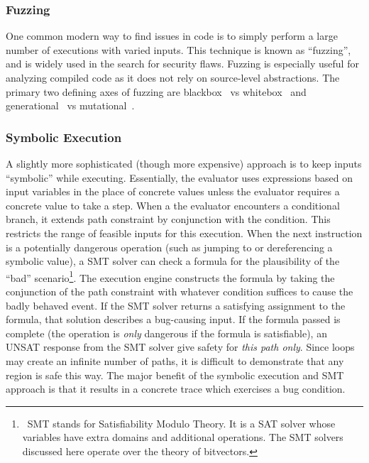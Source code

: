 \subsubsection{Fuzzing}
One common modern way to find issues in code is to simply perform a large number of executions with varied inputs.
This technique is known as ``fuzzing'', and is widely used in the search for security flaws.
Fuzzing is especially useful for analyzing compiled code as it does not rely on source-level abstractions.
The primary two defining axes of fuzzing are blackbox~\cite{peach,zzuf,rebert2014} vs whitebox~\cite{klee,godefroid2008,avgerinos2014} and generational~\cite{peach} vs mutational~\cite{zzuf}.

\subsubsection{Symbolic Execution}
A slightly more sophisticated (though more expensive) approach is to keep inputs ``symbolic'' while executing.
Essentially, the evaluator uses expressions based on input variables in the place of concrete values unless the evaluator requires a concrete value to take a step.
When a the evaluator encounters a conditional branch, it extends path constraint by conjunction with the condition.
This restricts the range of feasible inputs for this execution.
When the next instruction is a potentially dangerous operation (such as jumping to or dereferencing a symbolic value), a SMT solver can check a formula for the plausibility of the ``bad'' scenario\footnote{\
  SMT stands for Satisfiability Modulo Theory.
  It is a SAT solver whose variables have extra domains and additional operations.
  The SMT solvers discussed here operate over the theory of bitvectors.
}.
The execution engine constructs the formula by taking the conjunction of the path constraint with whatever condition suffices to cause the badly behaved event.
If the SMT solver returns a satisfying assignment to the formula, that solution describes a bug-causing input\cite{aeg,mayhem}.
If the formula passed is complete (the operation is \emph{only} dangerous if the formula is satisfiable), an UNSAT response from the SMT solver give safety for \emph{this path only}.
Since loops may create an infinite number of paths, it is difficult to demonstrate that any region is safe this way.
The major benefit of the symbolic execution and SMT approach is that it results in a concrete trace which exercises a bug condition.


